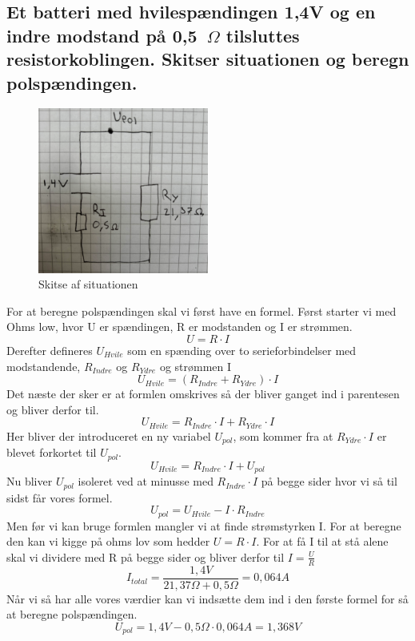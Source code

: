 \subsection{Et batteri med hvilespændingen 1,4V og en indre modstand på 0,5~$\Omega$ tilsluttes resistorkoblingen. Skitser situationen og beregn polspændingen.}
\begin{figure}[h!]
    \centering
    \includegraphics[width=0.5\textwidth]{figures/ellareskitse.png}
    \caption{Skitse af situationen}
\end{figure}
For at beregne polspændingen skal vi først have en formel.\newline
Først starter vi med Ohms low, hvor U er spændingen, R er modstanden og I er strømmen.
\begin{equation*}
    U = R \cdot I
\end{equation*}
Derefter defineres $U_{Hvile}$ som en spænding over to serieforbindelser med modstandende, $R_{Indre}$ og $R_{Ydre}$ og strømmen I
\begin{equation*}
    U_{Hvile} = (R_{Indre} + R_{Ydre}) \cdot I
\end{equation*}
Det næste der sker er at formlen omskrives så der bliver ganget ind i parentesen og bliver derfor til.
\begin{equation*}
    U_{Hvile} = R_{Indre} \cdot I + R_{Ydre} \cdot I
\end{equation*}
Her bliver der introduceret en ny variabel $U_{pol}$, som kommer fra at $R_{Ydre} \cdot I$ er blevet forkortet til $U_{pol}$.
\begin{equation*}
    U_{Hvile} = R_{Indre} \cdot I + U_{pol}
\end{equation*}
Nu bliver $U_{pol}$ isoleret ved at minusse med $R_{Indre} \cdot I$ på begge sider hvor vi så til sidst får vores formel.
\begin{equation*}
    U_{pol}=U_{Hvile}-I\cdot R_{Indre}
\end{equation*}
Men før vi kan bruge formlen mangler vi at finde strømstyrken I. For at beregne den kan vi kigge på ohms lov som hedder $U = R \cdot I$. For at få I til at stå alene skal vi dividere med R på begge sider og bliver derfor til $I = \frac{U}{R}$
\begin{equation*}
    I_{total}=\frac{1,4V}{21,37\Omega+0,5\Omega}=0,064A
\end{equation*}
Når vi så har alle vores værdier kan vi indsætte dem ind i den første formel for så at beregne polspændingen.
\begin{equation*}
    U_{pol}=1,4V-0,5\Omega\cdot 0,064A=1,368V
\end{equation*}
\newpage